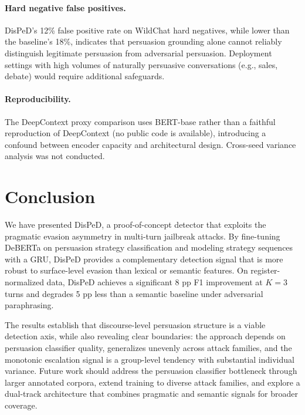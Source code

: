 \documentclass[11pt,a4paper]{article}
\begin{document}
\paragraph{Hard negative false positives.}
DisPeD's 12\% false positive rate on WildChat hard negatives, while lower than the baseline's 18\%, indicates that persuasion grounding alone cannot reliably distinguish legitimate persuasion from adversarial persuasion.
Deployment settings with high volumes of naturally persuasive conversations (e.g., sales, debate) would require additional safeguards.

\paragraph{Reproducibility.}
The DeepContext proxy comparison uses BERT-base rather than a faithful reproduction of DeepContext (no public code is available), introducing a confound between encoder capacity and architectural design.
Cross-seed variance analysis was not conducted.

\section{Conclusion}

We have presented DisPeD, a proof-of-concept detector that exploits the pragmatic evasion asymmetry in multi-turn jailbreak attacks.
By fine-tuning DeBERTa on persuasion strategy classification and modeling strategy sequences with a GRU, DisPeD provides a complementary detection signal that is more robust to surface-level evasion than lexical or semantic features.
On register-normalized data, DisPeD achieves a significant 8 pp F1 improvement at $K{=}3$ turns and degrades 5 pp less than a semantic baseline under adversarial paraphrasing.

The results establish that discourse-level persuasion structure is a viable detection axis, while also revealing clear boundaries: the approach depends on persuasion classifier quality, generalizes unevenly across attack families, and the monotonic escalation signal is a group-level tendency with substantial individual variance.
Future work should address the persuasion classifier bottleneck through larger annotated corpora, extend training to diverse attack families, and explore a dual-track architecture that combines pragmatic and semantic signals for broader coverage.
\end{document}
